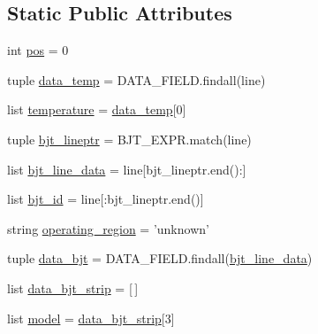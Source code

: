 \subsection*{Static Public Attributes}
\begin{DoxyCompactItemize}
\item 
int \hyperlink{classsage__circuit__analysis_1_1SmallSignalLinearCircuit_a40e559d5cb9c403ba04b5eda16cd4e2e}{pos} = 0
\item 
tuple \hyperlink{classsage__circuit__analysis_1_1SmallSignalLinearCircuit_aa1d8a76cfbbe1fe586d26ce644fdb993}{data\-\_\-temp} = D\-A\-T\-A\-\_\-\-F\-I\-E\-L\-D.\-findall(line)
\item 
list \hyperlink{classsage__circuit__analysis_1_1SmallSignalLinearCircuit_ae1ee383cac9037f0e46097d52f564fb7}{temperature} = \hyperlink{classsage__circuit__analysis_1_1SmallSignalLinearCircuit_aa1d8a76cfbbe1fe586d26ce644fdb993}{data\-\_\-temp}\mbox{[}0\mbox{]}
\item 
tuple \hyperlink{classsage__circuit__analysis_1_1SmallSignalLinearCircuit_a80d33b2587c9c3bf642678e2f4fa6a3b}{bjt\-\_\-lineptr} = B\-J\-T\-\_\-\-E\-X\-P\-R.\-match(line)
\item 
list \hyperlink{classsage__circuit__analysis_1_1SmallSignalLinearCircuit_a4010a5982eb6b7d5cd263f4c38ac3fff}{bjt\-\_\-line\-\_\-data} = line\mbox{[}bjt\-\_\-lineptr.\-end()\-:\mbox{]}
\item 
list \hyperlink{classsage__circuit__analysis_1_1SmallSignalLinearCircuit_a220f269787a83488cd8d3b559fea2193}{bjt\-\_\-id} = line\mbox{[}\-:bjt\-\_\-lineptr.\-end()\mbox{]}
\item 
string \hyperlink{classsage__circuit__analysis_1_1SmallSignalLinearCircuit_a161fcc3267d15de71683c9ef6ebd6edc}{operating\-\_\-region} = 'unknown'
\item 
tuple \hyperlink{classsage__circuit__analysis_1_1SmallSignalLinearCircuit_a84ae57694d12e012d04bc13249f5b864}{data\-\_\-bjt} = D\-A\-T\-A\-\_\-\-F\-I\-E\-L\-D.\-findall(\hyperlink{classsage__circuit__analysis_1_1SmallSignalLinearCircuit_a4010a5982eb6b7d5cd263f4c38ac3fff}{bjt\-\_\-line\-\_\-data})
\item 
list \hyperlink{classsage__circuit__analysis_1_1SmallSignalLinearCircuit_a4000b520524485f11cad047c3be83ecf}{data\-\_\-bjt\-\_\-strip} = \mbox{[}$\,$\mbox{]}
\item 
list \hyperlink{classsage__circuit__analysis_1_1SmallSignalLinearCircuit_a97cef0f5bbc88e9957746b1841f88942}{model} = \hyperlink{classsage__circuit__analysis_1_1SmallSignalLinearCircuit_a4000b520524485f11cad047c3be83ecf}{data\-\_\-bjt\-\_\-strip}\mbox{[}3\mbox{]}

\end{DoxyCompactItemize}
